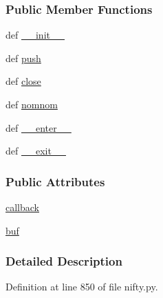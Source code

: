 \subsubsection*{Public Member Functions}
\begin{DoxyCompactItemize}
\item 
def \hyperlink{classforcebalance_1_1nifty_1_1LineChunker_ae3ab9c66002ff8c9cb1c431037a5b1bd}{\-\_\-\-\_\-init\-\_\-\-\_\-}
\item 
def \hyperlink{classforcebalance_1_1nifty_1_1LineChunker_a55559f3b01f982fabd8521d3255a659c}{push}
\item 
def \hyperlink{classforcebalance_1_1nifty_1_1LineChunker_a3ff808a8e8d1f37c1509b2c8a40793a0}{close}
\item 
def \hyperlink{classforcebalance_1_1nifty_1_1LineChunker_a8136910aad30f357f0ededf79803e582}{nomnom}
\item 
def \hyperlink{classforcebalance_1_1nifty_1_1LineChunker_a968159ea8646ab0a1b5f5a9428855ce5}{\-\_\-\-\_\-enter\-\_\-\-\_\-}
\item 
def \hyperlink{classforcebalance_1_1nifty_1_1LineChunker_a02b0e239f9fba956c36c4eb5d2771132}{\-\_\-\-\_\-exit\-\_\-\-\_\-}
\end{DoxyCompactItemize}
\subsubsection*{Public Attributes}
\begin{DoxyCompactItemize}
\item 
\hyperlink{classforcebalance_1_1nifty_1_1LineChunker_aadc78efc999ffbb1decfeb593d8a3b69}{callback}
\item 
\hyperlink{classforcebalance_1_1nifty_1_1LineChunker_aad441300bffd286519b62c0f871f3867}{buf}
\end{DoxyCompactItemize}


\subsubsection{Detailed Description}


Definition at line 850 of file nifty.\-py.



